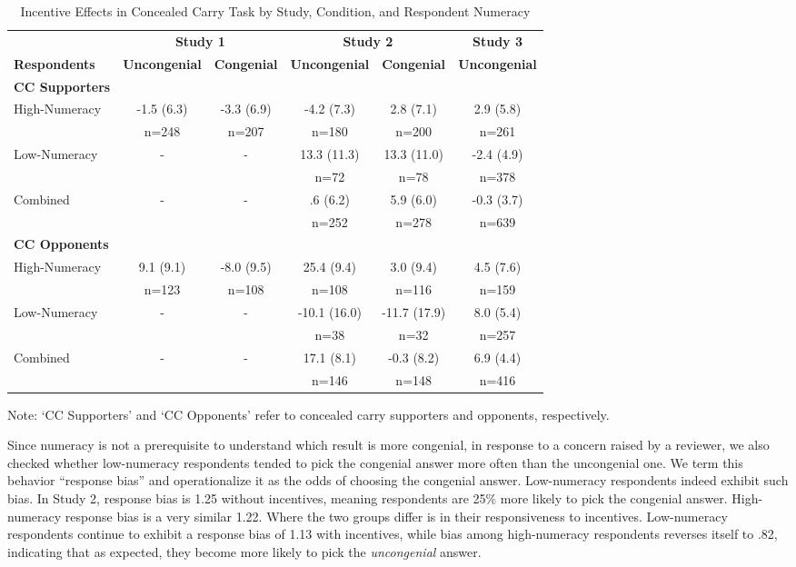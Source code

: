 \documentclass[12pt, letterpaper]{article}
\begin{document}
\singlespacing
\begin{table}[h]
\centering
\caption{Incentive Effects in Concealed Carry Task by Study, Condition, and Respondent Numeracy} \label{tab:accnum}
\begin{tabular}{| l | c c | c c | c |}
\hline 
& \multicolumn{2}{c}{\bf Study 1}	& \multicolumn{2}{|c|}{\bf Study 2} & {\bf Study 3}	\\
{\bf Respondents} & {\bf Uncongenial} & {\bf Congenial} & {\bf Uncongenial} & {\bf Congenial} & {\bf Uncongenial}	\\ 
\hline
{\bf CC Supporters} & & & & & \\
High-Numeracy	& -1.5 (6.3)& -3.3 (6.9)	& -4.2 (7.3)	& 2.8 (7.1)		& 2.9 (5.8)	\\ 
			& n=248	& n=207		& n=180		& n=200		& n=261	\\ 
Low-Numeracy	& -		& -			& 13.3 (11.3)	& 13.3 (11.0)	& -2.4 (4.9)\\ 
			& 		& 			& n=72		& n=78		& n=378	\\ 
Combined		& -		& -			& .6 (6.2)		& 5.9 (6.0)		& -0.3 (3.7)\\ 
			& 		&			& n=252		& n=278		& n=639	\\ 
\hline
{\bf CC Opponents} & & & & & \\
High-Numeracy	& 9.1 (9.1)	& -8.0 (9.5)	& 25.4 (9.4) 	& 3.0 (9.4)		& 4.5 (7.6)	\\ 
			& n=123	& n=108		& n=108		& n=116		& n=159	\\ 
Low-Numeracy	& - 		& -			& -10.1 (16.0)	& -11.7 (17.9)	& 8.0 (5.4)	\\ 
			& 		& 			& n=38		& n=32		& n=257	\\ 
Combined		& -		& -			& 17.1 (8.1)	& -0.3 (8.2)	& 6.9 (4.4)	\\ 
			& 		& 			& n=146		& n=148		& n=416	\\ 
\hline
\end{tabular}
\footnotesize{Note: `CC Supporters' and `CC Opponents' refer to concealed carry supporters and opponents, respectively.}
\end{table}
\doublespacing

Since numeracy is not a prerequisite to understand which result is more congenial, in response to a concern raised by a reviewer, we also checked whether low-numeracy respondents tended to pick the congenial answer more often than the uncongenial one. We term this behavior ``response bias'' and operationalize it as the odds of choosing the congenial answer. Low-numeracy respondents indeed exhibit such bias. In Study 2, response bias is 1.25 without incentives, meaning respondents are 25\% more likely to pick the congenial answer. High-numeracy response bias is a very similar 1.22. Where the two groups differ is in their responsiveness to incentives. Low-numeracy respondents continue to exhibit a response bias of 1.13 with incentives, while bias among high-numeracy respondents reverses itself to .82, indicating that as expected, they become more likely to pick the {\it uncongenial} answer.
\end{document}
